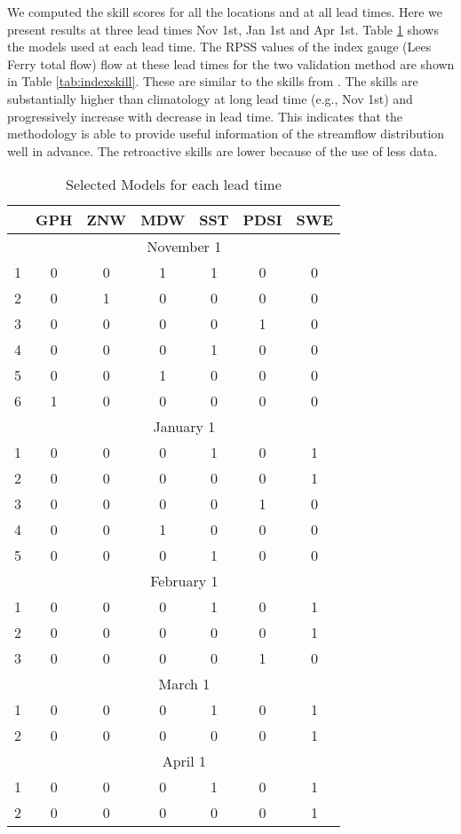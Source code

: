 \documentclass[final,5p,times,twocolumn,authoryear]{elsarticle}
\begin{document}
We computed the skill scores for all the locations and at all lead times. Here we present results at three lead times Nov 1st, Jan 1st and Apr 1st. Table \ref{tab:models} shows the models used at each lead time. The RPSS values of the index gauge (Lees Ferry total flow) flow at these lead times for the two validation method are shown in Table \ref{tab:indexskill}. These are similar to the skills from \cite{Bracken:2010cw}. The skills are substantially higher than climatology at long lead time (e.g., Nov 1st) and progressively increase with decrease in lead time. This indicates that the methodology is able to provide useful information of the streamflow distribution well in advance. The retroactive skills are lower because of the use of less data.
 
\begin{table}[ht]
\centering
\caption{Selected Models for each lead time}\label{tab:models}
\begin{tabular}{rcccccc} 
\toprule
& GPH & ZNW & MDW & SST & PDSI & SWE \\
\midrule
& \multicolumn{6}{c}{November 1} \\
\midrule
1 & 0 & 0 & 1 & 1 & 0 & 0\\
2 & 0 & 1 & 0 & 0 & 0 & 0\\
3 & 0 & 0 & 0 & 0 & 1 & 0\\
4 & 0 & 0 & 0 & 1 & 0 & 0\\
5 & 0 & 0 & 1 & 0 & 0 & 0\\
6 & 1 & 0 & 0 & 0 & 0 & 0\\
\midrule
& \multicolumn{6}{c}{January 1} \\
\midrule
1 & 0 & 0 & 0 & 1 & 0 & 1\\
2 & 0 & 0 & 0 & 0 & 0 & 1\\
3 & 0 & 0 & 0 & 0 & 1 & 0\\
4 & 0 & 0 & 1 & 0 & 0 & 0\\
5 & 0 & 0 & 0 & 1 & 0 & 0\\
\midrule
& \multicolumn{6}{c}{February 1} \\
\midrule
1 & 0 & 0 & 0 & 1 & 0 & 1\\
2 & 0 & 0 & 0 & 0 & 0 & 1\\
3 & 0 & 0 & 0 & 0 & 1 & 0\\
\midrule
& \multicolumn{6}{c}{March 1} \\
\midrule
1 & 0 & 0 & 0 & 1 & 0 & 1\\
2 & 0 & 0 & 0 & 0 & 0 & 1\\
\midrule
& \multicolumn{6}{c}{April 1} \\
\midrule
1 & 0 & 0 & 0 & 1 & 0 & 1\\
2 & 0 & 0 & 0 & 0 & 0 & 1\\
\bottomrule
\end{tabular}
\end{table}
 
\end{document}
